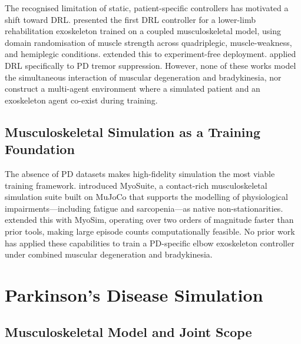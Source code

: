 \documentclass{article}
\begin{document}
The recognised limitation of static, patient-specific controllers has
motivated a shift toward DRL. \citet{luo2023} presented the first DRL
controller for a lower-limb rehabilitation exoskeleton trained on a
coupled musculoskeletal model, using domain randomisation of muscle
strength across quadriplegic, muscle-weakness, and hemiplegic conditions.
\citet{luo2024} extended this to experiment-free deployment.
\citet{endrei2025} applied DRL specifically to PD tremor suppression.
However, none of these works model the simultaneous interaction of
muscular degeneration and bradykinesia, nor construct a multi-agent
environment where a simulated patient and an exoskeleton agent
co-exist during training.

\subsection{Musculoskeletal Simulation as a Training Foundation}

The absence of PD datasets makes high-fidelity simulation the most viable
training framework. \citet{caggiano2022} introduced MyoSuite, a
contact-rich musculoskeletal simulation suite built on MuJoCo that
supports the modelling of physiological impairments---including fatigue
and sarcopenia---as native non-stationarities. \citet{wang2022} extended
this with MyoSim, operating over two orders of magnitude faster than
prior tools, making large episode counts computationally feasible.
No prior work has applied these capabilities to train a PD-specific
elbow exoskeleton controller under combined muscular degeneration and
bradykinesia.

\section{Parkinson's Disease Simulation}
\label{sec:pdsim}

\subsection{Musculoskeletal Model and Joint Scope}
\end{document}
